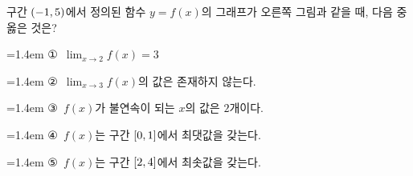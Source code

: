 \noindent\begin{minipage}[t]{0.58\linewidth}\vspace{0pt}\raggedright 구간 $(-1{,}\mkern3mu\mathopen{}5)$에서 정의된 함수 $y=f(x)$의 그래프가 오른쪽 그림과 같을 때, 다음 중 옳은 것은?\end{minipage}\hfill\begin{minipage}[t]{0.4\linewidth}\vspace{0pt}\centering \resizebox{\ifdim\width>\linewidth\linewidth\else\width\fi}{!}{}\end{minipage}\par
\par\medskip\par\noindent\hangindent=1.4em {\small ①}\ $\displaystyle\lim_{x\to 2} f(x)=3$\par\noindent\hangindent=1.4em {\small ②}\ $\displaystyle\lim_{x\to 3} f(x)$의 값은 존재하지 않는다.\par\noindent\hangindent=1.4em {\small ③}\ $f(x)$가 불연속이 되는 $x$의 값은 $2$개이다.\par\noindent\hangindent=1.4em {\small ④}\ $f(x)$는 구간 $[0{,}\mkern3mu\mathopen{}1]$에서 최댓값을 갖는다.\par\noindent\hangindent=1.4em {\small ⑤}\ $f(x)$는 구간 $[2{,}\mkern3mu\mathopen{}4]$에서 최솟값을 갖는다.\par\medskip
